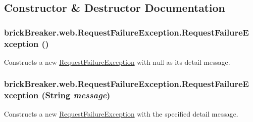 \subsection{Constructor \& Destructor Documentation}
\hypertarget{classbrick_breaker_1_1web_1_1_request_failure_exception_aabe6d2ef76adb37a25d7d828be02fb3f}{
\subsubsection[{RequestFailureException}]{\setlength{\rightskip}{0pt plus 5cm}brickBreaker.web.RequestFailureException.RequestFailureException ()}}
\label{classbrick_breaker_1_1web_1_1_request_failure_exception_aabe6d2ef76adb37a25d7d828be02fb3f}
Constructs a new {\ttfamily \hyperlink{classbrick_breaker_1_1web_1_1_request_failure_exception}{RequestFailureException}} with {\ttfamily null} as its detail message. \hypertarget{classbrick_breaker_1_1web_1_1_request_failure_exception_ac88ada25c67073741864d896fc6192a7}{
\subsubsection[{RequestFailureException}]{\setlength{\rightskip}{0pt plus 5cm}brickBreaker.web.RequestFailureException.RequestFailureException (String {\em message})}}
\label{classbrick_breaker_1_1web_1_1_request_failure_exception_ac88ada25c67073741864d896fc6192a7}
Constructs a new {\ttfamily \hyperlink{classbrick_breaker_1_1web_1_1_request_failure_exception}{RequestFailureException}} with the specified detail message.


